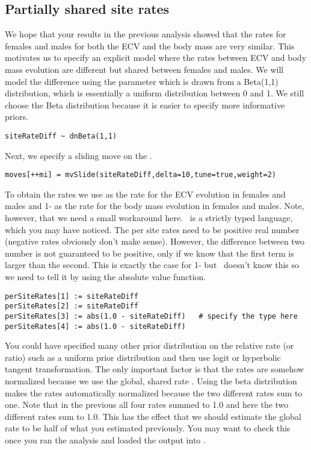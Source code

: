 \subsection{Partially shared site rates}
We hope that your results in the previous analysis showed that the rates for females and males for both the ECV and the body mass are very similar.
This motivates us to specify an explicit model where the rates between ECV and body mass evolution are different but shared between females and males.
We will model the difference using the  parameter which is drawn from a Beta(1,1) distribution, which is essentially a uniform distribution between 0 and 1.
We still choose the Beta distribution because it is easier to specify more informative priors.
{\tt \small \begin{snugshade*}
\begin{lstlisting}
siteRateDiff ~ dnBeta(1,1)
\end{lstlisting}
\end{snugshade*}}
Next, we specify a sliding move on the .
{\tt \small \begin{snugshade*}
\begin{lstlisting}
moves[++mi] = mvSlide(siteRateDiff,delta=10,tune=true,weight=2)
\end{lstlisting}
\end{snugshade*}}
To obtain the rates we use  as the rate for the ECV evolution in females and males and 1- as the rate for the body mass evolution in females and males.
Note, however, that we need a small workaround here. \Rev~is a strictly typed language, which you may have noticed. The per site rates need to be positive real number (negative rates obviously don't make sense). However, the difference between two number is not guaranteed to be positive, only if we know that the first term is larger than the second. This is exactly the case for 1- but \RevBayes~doesn't know this so we need to tell it by using the absolute value  function.
{\tt \small \begin{snugshade*}
\begin{lstlisting}
perSiteRates[1] := siteRateDiff
perSiteRates[2] := siteRateDiff
perSiteRates[3] := abs(1.0 - siteRateDiff)   # specify the type here
perSiteRates[4] := abs(1.0 - siteRateDiff)
\end{lstlisting}
\end{snugshade*}}
You could have specified many other prior distribution on the relative rate (or ratio) such as a uniform prior distribution and then use logit or hyperbolic tangent transformation.
The only important factor is that the rates are somehow normalized because we use the global, shared rate .
Using the beta distribution makes the rates automatically normalized because the two different rates sum to one. Note that in the previous all four rates summed to 1.0 and here the two different rates sum to 1.0. This has the effect that we should estimate the global rate  to be half of what you estimated previously. You may want to check this once you ran the analysis and loaded the output into \Tracer. 


